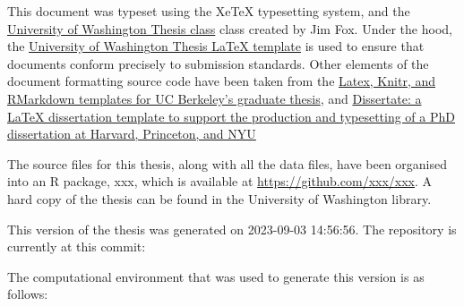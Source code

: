 \documentclass[print]{nuthesis}
\begin{document}
This document was typeset using the XeTeX typesetting system, and the \href{http://staff.washington.edu/fox/tex/}{University of Washington Thesis class} class created by Jim Fox. Under the hood, the \href{https://github.com/UWIT-IAM/UWThesis}{University of Washington Thesis LaTeX template} is used to ensure that documents conform precisely to submission standards. Other elements of the document formatting source code have been taken from the \href{https://github.com/stevenpollack/ucbthesis}{Latex, Knitr, and RMarkdown templates for UC Berkeley's graduate thesis}, and \href{https://github.com/suchow/Dissertate}{Dissertate: a LaTeX dissertation template to support the production and typesetting of a PhD dissertation at Harvard, Princeton, and NYU}

The source files for this thesis, along with all the data files, have been organised into an R package, xxx, which is available at \url{https://github.com/xxx/xxx}. A hard copy of the thesis can be found in the University of Washington library.

This version of the thesis was generated on 2023-09-03 14:56:56. The repository is currently at this commit:

The computational environment that was used to generate this version is as follows:
\end{document}
